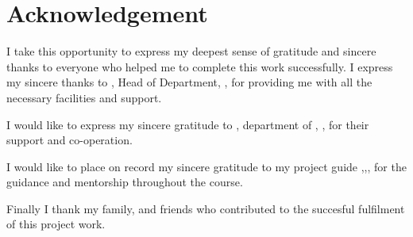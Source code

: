 \chapter*{Acknowledgement}%
%



I take this opportunity to express my deepest sense of gratitude and sincere thanks to everyone who helped me to complete this work successfully. I express my sincere thanks to \textbf{ \hod}, Head of Department, \dept, \college\hspace*{2pt} \collegeplace \hspace*{2pt} for providing  me with all the necessary facilities and support.\par

 I would like to express my sincere gratitude to \textbf{\semcordinatorA}, \hspace*{2pt} department of \hspace*{2pt} \dept, \hspace*{2pt} \college, \hspace*{2pt} \collegeplace \hspace*{2pt} for their support and co-operation.

\noindent I would like to place on record my sincere gratitude to my project guide \textbf{\guide},\hspace*{2pt}\guidedes,\hspace*{2pt}\dept,\hspace*{2pt}\college \hspace*{2pt} for the guidance and mentorship throughout the course.

Finally I thank my family, and friends who contributed to the succesful fulfilment of this project work.

\vspace*{30pt}
\begin{flushright}
	\textbf{\author}
\end{flushright}
\thispagestyle{plain}
